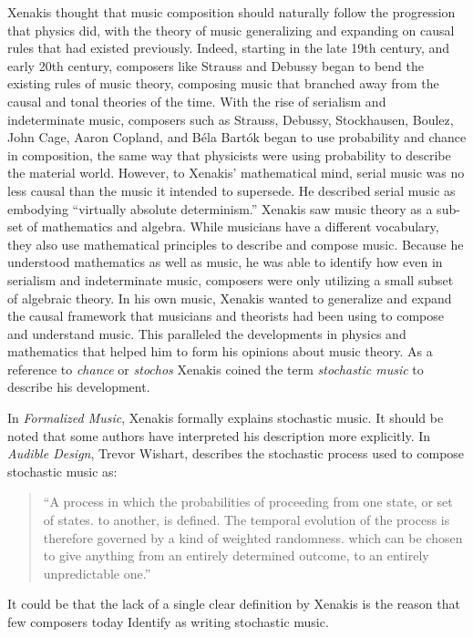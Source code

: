 Xenakis thought that music composition should naturally follow the
progression that physics did, with the theory of music generalizing
and expanding on causal rules that had existed previously. Indeed,
starting in the late 19th century, and early 20th century, composers
like Strauss and Debussy began to bend the existing rules of music
theory, composing music that branched away from the causal and tonal
theories of the time. With the rise of serialism and
indeterminate music, composers such as Strauss, Debussy,
Stockhausen, Boulez, John Cage, Aaron Copland, and B\'{e}la Bart\'{o}k
began to use probability and chance in composition, the same way that
physicists were using probability to describe the material
world. However, to Xenakis' mathematical mind, serial music was no
less causal than the music it intended to supersede. He described
serial music as embodying ``virtually absolute
determinism.''\cite{xenakis1992formalized} Xenakis saw music theory as
a sub-set of mathematics and algebra. While musicians have a different
vocabulary, they also use mathematical principles to describe and
compose music. Because he understood mathematics as well as music, he
was able to identify how even in serialism and indeterminate music,
composers were only utilizing a small subset of algebraic theory. In
his own music, Xenakis wanted to generalize and expand the causal
framework that musicians and theorists had been using to compose and
understand music. This paralleled the developments in physics and
mathematics that helped him to form his opinions about music theory.
As a reference to \emph{chance} or \emph{stochos} Xenakis coined the term
\emph{stochastic music} to describe his development.

In \textit{Formalized Music},\cite{xenakis1992formalized} Xenakis
formally explains stochastic music. It should be noted that some
authors have interpreted his description more explicitly. In
\textit{Audible Design}, Trevor Wishart, describes the stochastic
process used to compose stochastic music as:
\begin{quotation}
  ``A process in which the probabilities of proceeding from one state,
  or set of states. to another, is defined. The temporal evolution of
  the process is therefore governed by a kind of weighted
  randomness. which can be chosen to give anything from an entirely
  determined outcome, to an entirely unpredictable
  one.''\cite{Wishart1994}
\end{quotation}
It could be that the lack of a single clear definition by Xenakis is
the reason that few composers today Identify as writing stochastic
music.

